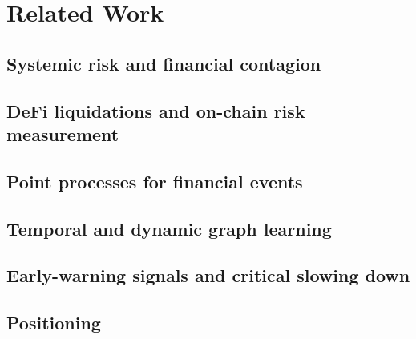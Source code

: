 \section{Related Work}\label{sec:related}

\subsection{Systemic risk and financial contagion}\label{sec:rel-contagion}

\subsection{DeFi liquidations and on-chain risk measurement}\label{sec:rel-defi}

\subsection{Point processes for financial events}\label{sec:rel-hawkes}

\subsection{Temporal and dynamic graph learning}\label{sec:rel-tgnn}

\subsection{Early-warning signals and critical slowing down}\label{sec:rel-ews}

\subsection{Positioning}\label{sec:rel-gap}
